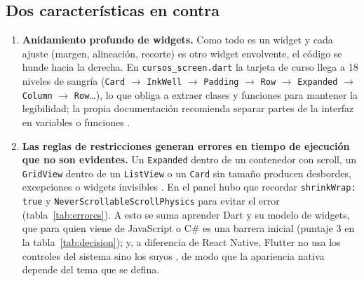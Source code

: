 \subsection{Dos características en contra}
\begin{enumerate}
	\item \textbf{Anidamiento profundo de widgets.} Como todo es un widget y cada ajuste (margen, alineación, recorte) es otro widget envolvente, el código se hunde hacia la derecha. En \texttt{cursos\_screen.dart} la tarjeta de curso llega a 18 niveles de sangría (\texttt{Card} $\rightarrow$ \texttt{InkWell} $\rightarrow$ \texttt{Padding} $\rightarrow$ \texttt{Row} $\rightarrow$ \texttt{Expanded} $\rightarrow$ \texttt{Column} $\rightarrow$ \texttt{Row}\ldots), lo que obliga a extraer clases y funciones para mantener la legibilidad; la propia documentación recomienda separar partes de la interfaz en variables o funciones \cite{flutterlayout}.
	\item \textbf{Las reglas de restricciones generan errores en tiempo de ejecución que no son evidentes.} Un \texttt{Expanded} dentro de un contenedor con scroll, un \texttt{GridView} dentro de un \texttt{ListView} o un \texttt{Card} sin tamaño producen desbordes, excepciones o widgets invisibles \cite{flutterconstr,flutterlayout}. En el panel hubo que recordar \texttt{shrinkWrap: true} y \texttt{NeverScrollableScrollPhysics} para evitar el error (tabla~\ref{tab:errores}). A esto se suma aprender Dart y su modelo de widgets, que para quien viene de JavaScript o C\# es una barrera inicial (puntaje 3 en la tabla~\ref{tab:decision}); y, a diferencia de React Native, Flutter no usa los controles del sistema sino los suyos \cite{flutterarq,rncomp}, de modo que la apariencia nativa depende del tema que se defina.
\end{enumerate}


